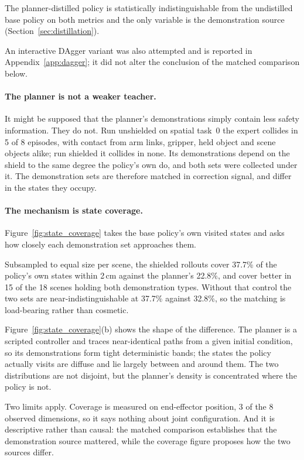 The planner-distilled policy is statistically indistinguishable from the undistilled base policy on
both metrics and the only variable is the demonstration source (Section~\ref{sec:distillation}).

An interactive DAgger variant was also attempted and is reported in Appendix~\ref{app:dagger}; it did not alter the conclusion of the matched comparison below.

\paragraph{The planner is not a weaker teacher.}
It might be supposed that the planner's demonstrations simply contain less safety information.
They do not. Run unshielded on spatial task~0 the expert collides in 5 of 8 episodes, with
contact from arm links, gripper, held object and scene objects alike; run shielded it collides
in none. Its demonstrations depend on the shield to the same degree the policy's own do, and
both sets were collected under it. The demonstration sets are therefore matched in correction
signal, and differ in the states they occupy.


\paragraph{The mechanism is state coverage.}
Figure~\ref{fig:state_coverage} takes the base policy's own visited states and asks
how closely each demonstration set approaches them.

Subsampled to equal size per scene, the shielded rollouts cover 37.7\% of the policy's own
states within 2\,cm against the planner's 22.8\%, and cover better in 15 of the 18 scenes
holding both demonstration types. Without that control the two sets are near-indistinguishable
at 37.7\% against 32.8\%, so the matching is load-bearing rather than cosmetic.

Figure~\ref{fig:state_coverage}(b) shows the shape of the difference. The planner is a
scripted controller and traces near-identical paths from a given initial condition, so its
demonstrations form tight deterministic bands; the states the policy actually visits are diffuse
and lie largely between and around them. The two distributions are not disjoint, but the planner's density is concentrated where the policy is not.

Two limits apply. Coverage is measured on end-effector position, 3 of the 8 observed dimensions,
so it says nothing about joint configuration. And it is descriptive rather than causal: the
matched comparison establishes that the demonstration source mattered, while the coverage figure
proposes how the two sources differ.

